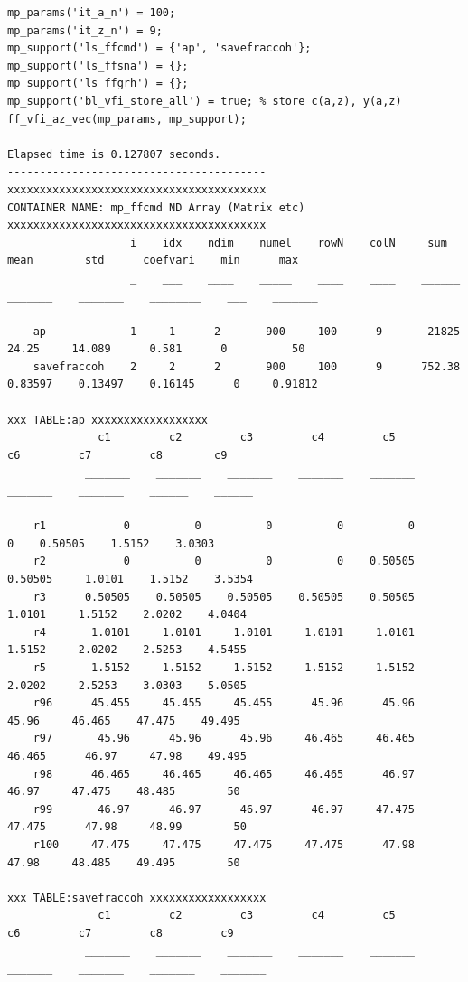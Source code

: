 \documentclass[
]{book}
\begin{document}
\begin{verbatim}
mp_params('it_a_n') = 100;
mp_params('it_z_n') = 9;
mp_support('ls_ffcmd') = {'ap', 'savefraccoh'};
mp_support('ls_ffsna') = {};
mp_support('ls_ffgrh') = {};
mp_support('bl_vfi_store_all') = true; % store c(a,z), y(a,z)
ff_vfi_az_vec(mp_params, mp_support);

Elapsed time is 0.127807 seconds.
----------------------------------------
xxxxxxxxxxxxxxxxxxxxxxxxxxxxxxxxxxxxxxxx
CONTAINER NAME: mp_ffcmd ND Array (Matrix etc)
xxxxxxxxxxxxxxxxxxxxxxxxxxxxxxxxxxxxxxxx
                   i    idx    ndim    numel    rowN    colN     sum       mean        std      coefvari    min      max  
                   _    ___    ____    _____    ____    ____    ______    _______    _______    ________    ___    _______

    ap             1     1      2       900     100      9       21825      24.25     14.089      0.581      0          50
    savefraccoh    2     2      2       900     100      9      752.38    0.83597    0.13497    0.16145      0     0.91812

xxx TABLE:ap xxxxxxxxxxxxxxxxxx
              c1         c2         c3         c4         c5         c6         c7         c8        c9  
            _______    _______    _______    _______    _______    _______    _______    ______    ______

    r1            0          0          0          0          0          0    0.50505    1.5152    3.0303
    r2            0          0          0          0    0.50505    0.50505     1.0101    1.5152    3.5354
    r3      0.50505    0.50505    0.50505    0.50505    0.50505     1.0101     1.5152    2.0202    4.0404
    r4       1.0101     1.0101     1.0101     1.0101     1.0101     1.5152     2.0202    2.5253    4.5455
    r5       1.5152     1.5152     1.5152     1.5152     1.5152     2.0202     2.5253    3.0303    5.0505
    r96      45.455     45.455     45.455      45.96      45.96      45.96     46.465    47.475    49.495
    r97       45.96      45.96      45.96     46.465     46.465     46.465      46.97     47.98    49.495
    r98      46.465     46.465     46.465     46.465      46.97      46.97     47.475    48.485        50
    r99       46.97      46.97      46.97      46.97     47.475     47.475      47.98     48.99        50
    r100     47.475     47.475     47.475     47.475      47.98      47.98     48.485    49.495        50

xxx TABLE:savefraccoh xxxxxxxxxxxxxxxxxx
              c1         c2         c3         c4         c5         c6         c7         c8         c9   
            _______    _______    _______    _______    _______    _______    _______    _______    _______


\end{verbatim}
\end{document}

